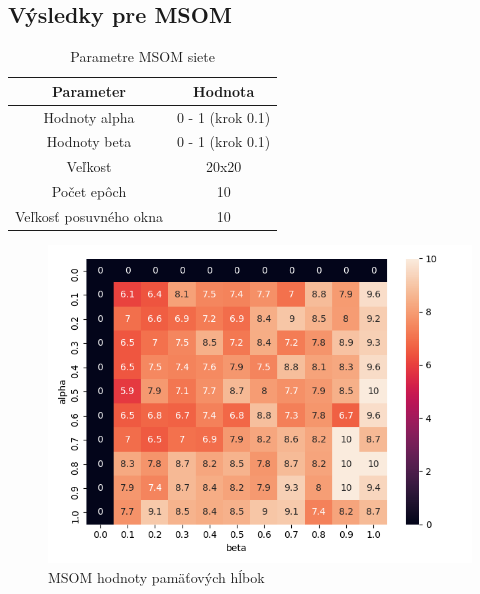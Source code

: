 \subsection{Výsledky pre MSOM}

\begin{table}[h!]
    \centering
    \begin{tabular}{|c|c|} 
     \hline
     Parameter & Hodnota \\ 
     \hline\hline
     Hodnoty alpha & 0 - 1 (krok 0.1)  \\ 
     \hline
     Hodnoty beta & 0 - 1  (krok 0.1) \\ 
     \hline
     Veľkost & 20x20  \\
     \hline
     Počet epôch & 10  \\
     \hline
     Veľkosť posuvného okna & 10  \\
     \hline
    \end{tabular}
    \caption{Parametre MSOM siete}
    \label{table:1}
    \end{table}
    
    \begin{figure}[H]
        \centering
        \includegraphics[width=\textwidth]{assets/msom_memory_span}
        \caption{MSOM hodnoty pamäťových hĺbok}
    \end{figure}
    
